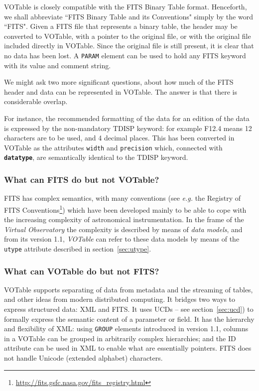 \documentclass[11pt,a4paper]{ivoa}
\def\Aref#1{section~\ref{#1}}
\let\fg=\color
\def\attr#1{{\tt{\fg{DarkRed}#1}}}
\def\elem#1{{\tt{\fg{DarkRed}#1}}}
\begin{document}
VOTable is closely compatible with the FITS Binary Table format.
Henceforth, we shall abbreviate ``FITS Binary Table  and its
Conventions" simply by the word ``FITS". Given a FITS
file that represents a binary table, the header may be converted to
VOTable, with a pointer to the original file, or with the original
file included directly in VOTable. Since the original file is still
present, it is clear that no data has been lost. A {\elem{PARAM}}
element can be used to hold any FITS keyword with its value
and comment string.

We might ask two more significant questions, about how much of
the FITS header and data can be represented in VOTable. The answer is
that there is considerable overlap.

For instance, the recommended formatting of the data for an
edition of the data is expressed by the non-mandatory TDISP keyword:
for example F12.4 means 12 characters are to be used, and 4 decimal
places. This has been converted in VOTable as the attributes {\attr{width}}
and {\attr{precision}}
which, connected with {\bf {\attr{datatype}}},
are semantically identical to the TDISP keyword.

\subsubsection*{What can FITS do but not VOTable?}

FITS has complex semantics, with many conventions
(see {\em e.g.} the Registry of FITS
 Conventions\footnote{\url{http://fits.gsfc.nasa.gov/fits_registry.html}})
which have been developed
mainly to be able to cope with the increasing complexity
of astronomical instrumentation. In the frame of the
{\em Virtual Observatory} the complexity is described by
means of {\em data models}, and from its version 1.1,
{\em VOTable} can refer to these data models by means
of the \attr{utype} attribute described in
\Aref{sec:utype}.

\subsubsection*{What can VOTable do but not FITS?}

VOTable supports separating of data from metadata and the
streaming of tables, and other ideas from modern distributed
computing. It bridges two ways to express structured data: XML and
FITS. It uses UCDs -- see \Aref{sec:ucd})
to formally express the semantic
content of a parameter or field. It has the hierarchy and flexibility
of XML: using \elem{GROUP} elements introduced in version 1.1,
columns in a VOTable can be grouped in arbitrarily complex hierarchies;
and the ID attribute can be used in XML
to enable what are essentially pointers.
FITS does not handle Unicode (extended alphabet) characters.
\end{document}
